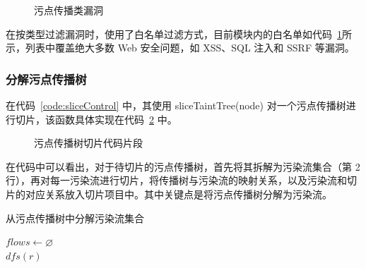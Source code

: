 \begin{figure}[!htbp]
    \centering
    \begin{minipage}[!htbp]{0.9\textwidth}
        
    \end{minipage}
    \caption{污点传播类漏洞}\label{code:caredVulns}
\end{figure}

在按类型过滤漏洞时，使用了白名单过滤方式，目前模块内的白名单如代码~\ref{code:caredVulns}所示，列表中覆盖绝大多数 Web 安全问题，如 XSS、SQL 注入和 SSRF 等漏洞。

\subsubsection{分解污点传播树}

在代码~\ref{code:sliceControl} 中，其使用 sliceTaintTree(node) 对一个污点传播树进行切片，该函数具体实现在代码~\ref{code:sliceTree} 中。

 \begin{figure}[!htbp]
     \centering
     \begin{minipage}[!htbp]{0.9\textwidth}
         
     \end{minipage}
     \caption{污点传播树切片代码片段}\label{code:sliceTree}
 \end{figure}
 
 在代码中可以看出，对于待切片的污点传播树，首先将其拆解为污染流集合（第 2 行），再对每一污染流进行切片，将传播树与污染流的映射关系，以及污染流和切片的对应关系放入切片项目中。其中关键点是将污点传播树分解为污染流。
 
 \begin{algorithm}[!htb]\footnotesize
     \caption{从污点传播树中分解污染流集合}
     \label{alg:getTaintFlows}
     $flows \leftarrow \varnothing$\\
     $dfs(r)$\\
 \end{algorithm}

